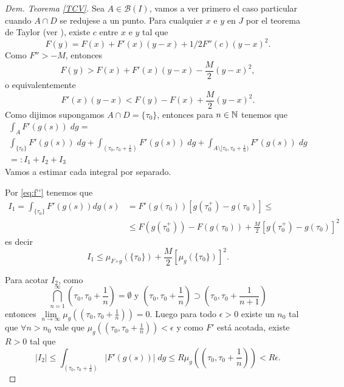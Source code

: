 \begin{proof}[Dem. Teorema \eqref{TCV}]
Sea $A\in \mathcal{B}(I)$, vamos a ver primero el caso particular cuando
$A\cap D$ se redujese a un punto.
 Para cualquier $x$ e $y$ en $J$ por el teorema de Taylor (ver \cite[pg 13]{Evanz}), existe $c$ entre $x$ e $y$ tal que
		$$F(y)=F(x)+F'(x)(y-x)+1/2F''(c)(y-x)^2.$$
		Como $F''>-M $, entonces
		$$F(y)>F(x)+F'(x)(y-x)-\frac{M}{2}(y-x)^2,$$ 
		o equivalentemente 
		\begin{equation}	\label{eq:f''}
			F'(x)(y-x)<F(y)-F(x)+\frac{M}{2}(y-x)^2.
		\end{equation}
		Como dijimos supongamos  $A\cap D=\{\tau_0\}$, entonces para $n\in \mathbb{N}$ tenemos que
		\begin{multline*}
			\int_AF'(g(s))\; dg=\\ \int_{\{\tau_0\}}F'(g(s))\; dg+\int_{(\tau_0,\tau_0+\frac{1}{n})}F'(g(s))\; dg+ \int_{A\setminus [\tau_0,\tau_0+\frac{1}{n})}F'(g(s))\; dg\\
             =:I_1+I_2+I_3
		\end{multline*}
		Vamos a estimar cada integral por separado.
  
 Por \eqref{eq:f''} tenemos que
		\begin{equation*}
  \begin{split}
		I_1=\int_{\{\tau_0\}}F'(g(s))dg(s)&=F'(g(\tau_0))\left[g(\tau_0^+)-g(\tau_0) \right]\leq\\
		&\leq F(g(\tau_0^+))- F(g(\tau_0))+\frac{M}{2}\left[ g(\tau_0^+)-g(\tau_0)\right]^2
  \end{split}
	\end{equation*}
	es decir
		\begin{equation}
			\label{eq:obs1}
			I_1\leq \mu_{F\circ g}(\{\tau_0\})+\frac{M}{2}\left[ \mu_{g}(\{\tau_0\})\right]^2 .
		\end{equation} 
	
Para acotar $I_2$, como $$\bigcap_{n=1}^{\infty}\left( \tau_0,\tau_0+\frac{1}{n}\right) =\emptyset \text{ y }  \left( \tau_0,\tau_0+\frac{1}{n}\right) \supset \left( \tau_0,\tau_0+\frac{1}{n+1}\right) $$
	entonces $\lim\limits_{n\to \infty}\mu_{g}\left( \left( \tau_0,\tau_0+\frac{1}{n}\right)\right)=0 $. 
Luego para todo $\epsilon>0$ existe un $n_0$ tal que $\forall n>n_0$ vale que   $\mu_{g}\left( \left( \tau_0,\tau_0+\frac{1}{n}\right)\right)<\epsilon$ y  como $F'$ está acotada, existe $R>0$ tal que 
\begin{equation*}
	\left|I_2\right| \leq\int_{(\tau_0,\tau_0+\frac{1}{n})}|F'(g(s))|\; dg 
  \leq R \mu_{g}\left( \left( \tau_0,\tau_0+\frac{1}{n}\right)\right)<R\epsilon. 
\end{equation*}


\end{proof}
